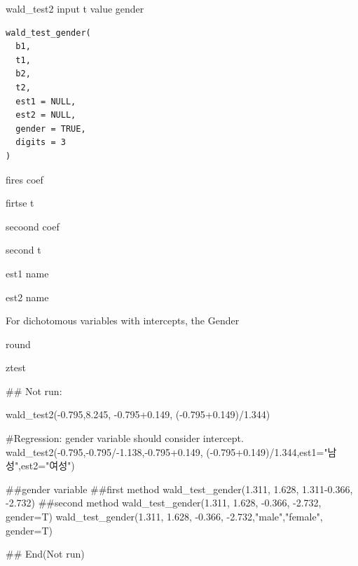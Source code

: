 \documentclass[a4paper]{book}
\begin{document}
%
\begin{Description}
wald\_test2 input t value gender
\end{Description}
%
\begin{Usage}
\begin{verbatim}
wald_test_gender(
  b1,
  t1,
  b2,
  t2,
  est1 = NULL,
  est2 = NULL,
  gender = TRUE,
  digits = 3
)
\end{verbatim}
\end{Usage}
%
\begin{Arguments}
\begin{ldescription}
\item[\code{b1}] fires coef

\item[\code{t1}] firtse t

\item[\code{b2}] secoond coef

\item[\code{t2}] second t

\item[\code{est1}] est1 name

\item[\code{est2}] est2 name

\item[\code{gender}] For dichotomous variables with intercepts, the Gender

\item[\code{digits}] round
\end{ldescription}
\end{Arguments}
%
\begin{Value}
ztest
\end{Value}
%
\begin{Examples}
\begin{ExampleCode}
## Not run: 

wald_test2(-0.795,8.245, -0.795+0.149,  (-0.795+0.149)/1.344)

#Regression: gender variable should consider intercept.
wald_test2(-0.795,-0.795/-1.138,-0.795+0.149,
           (-0.795+0.149)/1.344,est1="남성",est2="여성")


##gender variable
##first method
wald_test_gender(1.311, 1.628, 1.311-0.366,  -2.732)
##second method
wald_test_gender(1.311, 1.628, -0.366,  -2.732, gender=T)
wald_test_gender(1.311, 1.628, -0.366,  -2.732,"male","female", gender=T)


## End(Not run)



\end{ExampleCode}
\end{Examples}
\end{document}

